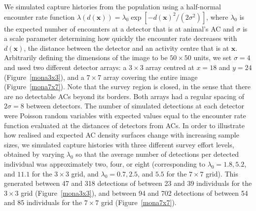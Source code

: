 \documentclass[useAMS,usenatbib,referee]{biom}
\begin{document}
We simulated capture histories from the population using a half-normal encounter rate function $\lambda(d(\textbf{x})) = \lambda_0\exp[-d(\textbf{x})^2/(2\sigma^2)]$, where $\lambda_0$ is the expected number of encounters at a detector that is at animal's AC and $\sigma$ is a scale parameter determining how quickly the encounter rate decreases with $d(\textbf{x})$, the distance between the detector and an activity centre that is at $\textbf{x}$. Arbitrarily defining the dimensions of the image to be $50\times 50$ units, we set $\sigma=4$ and used two different detector arrays: a $3\times3$ array centred at $x=18$ and $y=24$ (Figure~\ref{mona3x3}), and a $7\times 7$ array covering the entire image (Figure~\ref{mona7x7}). Note that the survey region is closed, in the sense that there are no detectable ACs beyond its borders. Both arrays had a regular spacing of $2\sigma=8$ between detectors. The number of simulated detections at each detector were Poisson random variables with expected values equal to the encounter rate function evaluated at the distances of detectors from ACs. In order to illustrate how realised and expected AC density surfaces change with increasing sample sizes, we simulated capture histories with three different survey effort levels, obtained by varying $\lambda_0$ so that the average number of detections per detected individual was approximately two, four, or eight (corresponding to $\lambda_0=1.8, 5.2$, and $11.1$ for the $3\times 3$ grid, and $\lambda_0=0.7, 2.5$, and $5.5$ for the $7\times 7$ grid). This generated between 47 and 318 detections of between 23 and 39 individuals for the $3\times 3$ grid (Figure~\ref{mona3x3}), and between 94 and 702 detections of between 54 and 85 individuals for the $7\times 7$ grid (Figure~\ref{mona7x7}).
\end{document}
